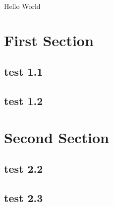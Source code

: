 \documentclass{article}
\begin{document}
Hello World

\section{First Section}

\subsection{test 1.1}


\subsection{test 1.2}

\section{Second Section}



\subsection{test 2.2}

\subsection{test 2.3}

\printindex
\end{document}
